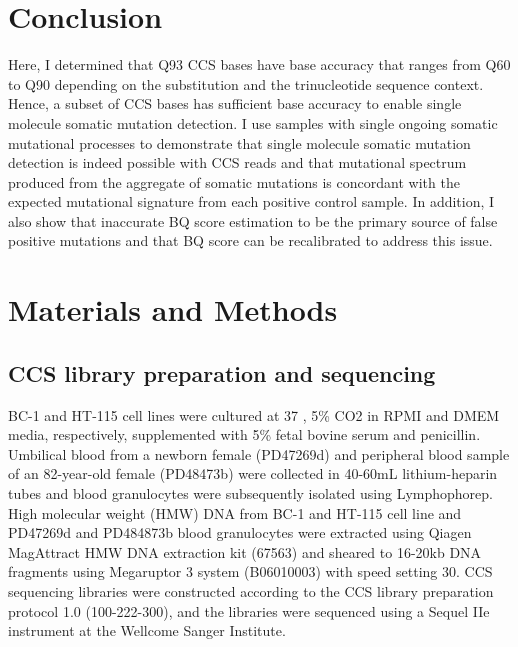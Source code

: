 

\section{Conclusion}

Here, I determined that Q93 CCS bases have base accuracy that ranges from Q60 to Q90 depending on the substitution and the trinucleotide sequence context. Hence, a subset of CCS bases has sufficient base accuracy to enable single molecule somatic mutation detection. I use samples with single ongoing somatic mutational processes to demonstrate that single molecule somatic mutation detection is indeed possible with CCS reads and that mutational spectrum produced from the aggregate of somatic mutations is concordant with the expected mutational signature from each positive control sample. In addition, I also show that inaccurate BQ score estimation to be the primary source of false positive mutations and that BQ score can be recalibrated to address this issue. 

\section{Materials and Methods}
\label{sec:himut}

\subsection{CCS library preparation and sequencing}


BC-1 and HT-115 cell lines were cultured at 37 \textcelsius, 5\% CO2 in RPMI and DMEM media, respectively, supplemented with 5\% fetal bovine serum and penicillin. Umbilical blood from a newborn female (PD47269d) and peripheral blood sample of an 82-year-old female (PD48473b) were collected in 40-60mL lithium-heparin tubes and blood granulocytes were subsequently isolated using Lymphophorep. High molecular weight (HMW) DNA from BC-1 and HT-115 cell line and PD47269d and PD484873b blood granulocytes were extracted using Qiagen MagAttract HMW DNA extraction kit (67563) and sheared to 16-20kb DNA fragments using Megaruptor 3 system (B06010003) with speed setting 30. CCS sequencing libraries were constructed according to the CCS library preparation protocol 1.0 (100-222-300), and the libraries were sequenced using a Sequel IIe instrument at the Wellcome Sanger Institute. 

